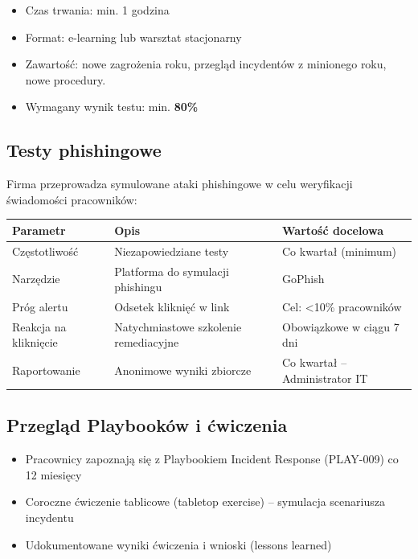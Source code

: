 \documentclass[12pt,a4paper]{article}
\providecommand{\tightlist}{\setlength{\itemsep}{0pt}\setlength{\parskip}{0pt}}
\begin{document}
\begin{itemize}
\tightlist
\item
  Czas trwania: min. 1 godzina
\item
  Format: e-learning lub warsztat stacjonarny
\item
  Zawartość: nowe zagrożenia roku, przegląd incydentów z minionego roku,
  nowe procedury.
\item
  Wymagany wynik testu: min. \textbf{80\%}
\end{itemize}

\subsection{Testy phishingowe}\label{testy-phishingowe}

Firma przeprowadza symulowane ataki phishingowe w celu weryfikacji
świadomości pracowników:

\begin{longtable}[]{@{}>{\raggedright\arraybackslash}p{}>{\raggedright\arraybackslash}p{}>{\raggedright\arraybackslash}p{}@{}}
\toprule\noalign{}
Parametr & Opis & Wartość docelowa \\
\midrule\noalign{}
\endhead
\bottomrule\noalign{}
\endlastfoot
Częstotliwość & Niezapowiedziane testy & Co kwartał (minimum) \\
Narzędzie & Platforma do symulacji phishingu & GoPhish \\
Próg alertu & Odsetek kliknięć w link & Cel: \textless10\%
pracowników \\
Reakcja na kliknięcie & Natychmiastowe szkolenie remediacyjne &
Obowiązkowe w ciągu 7 dni \\
Raportowanie & Anonimowe wyniki zbiorcze & Co kwartał -- Administrator IT \\
\end{longtable}

\subsection{Przegląd Playbooków i
ćwiczenia}\label{przeglux105d-playbookuxf3w-i-ux107wiczenia}

\begin{itemize}
\tightlist
\item
  Pracownicy zapoznają się z Playbookiem Incident Response (PLAY-009) co
  12 miesięcy
\item
  Coroczne ćwiczenie tablicowe (tabletop exercise) -- symulacja
  scenariusza incydentu
\item
  Udokumentowane wyniki ćwiczenia i wnioski (lessons learned)
\end{itemize}
\end{document}

